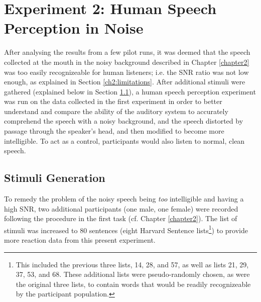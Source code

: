 \documentclass[dissertation,copyright]{uathesis}
\begin{document}
\section{Experiment 2: Human Speech Perception in Noise}
\label{expt2}

After analysing the results from a few pilot runs, it was deemed that the speech collected at the mouth in the noisy background described in Chapter \ref{chapter2} was too easily recognizeable for human listeners; i.e. the SNR ratio was not low enough, as explained in Section \ref{ch2:limitations}.  After additional stimuli were gathered (explained below in Section \ref{chap4:methods:stimuli}), a human speech perception experiment was run on the data collected in the first experiment in order to better understand and compare the ability of the auditory system to accurately comprehend the speech with a noisy background, and the speech distorted by passage through the speaker's head, and then modified to become more intelligible.  To act as a control, participants would also listen to normal, clean speech.

\subsection{Stimuli Generation}
\label{chap4:methods:stimuli}

To remedy the problem of the noisy speech being \textit{too} intelligible and having a high SNR, two additional participants (one male, one female) were recorded following the procedure in the first task (cf. Chapter \ref{chapter2}).  The list of stimuli was increased to 80 sentences (eight Harvard Sentence lists\footnote{This included the previous three lists, 14, 28, and 57, as well as lists 21, 29, 37, 53, and 68. These additional lists were pseudo-randomly chosen, as were the original three lists, to contain words that would be readily recognizeable by the participant population.}) to provide more reaction data from this present experiment.  
\end{document}
